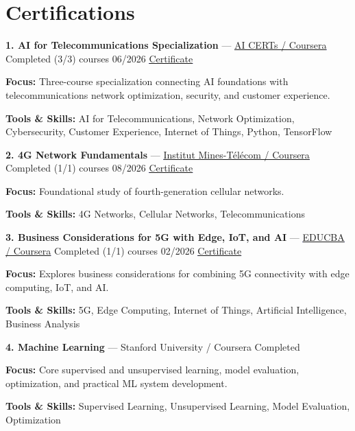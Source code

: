 \documentclass[9pt,letterpaper]{extarticle}
\begin{document}
\section{Certifications}
\noindent\textbf{1. AI for Telecommunications Specialization} {\small --- \textcolor{blue}{\underline{\href{https://coursera.org/verify/specialization/D8Y6MVC0XM51}{AI CERTs / Coursera}}} \textbar{} Completed (3/3) courses \textbar{} 06/2026 \textbar{} \textcolor{blue}{\underline{\href{https://waseemraza844.github.io/portfolio/certificates/wireless/ai-for-telecom.pdf}{Certificate}}}}\par
\textbf{Focus:} Three-course specialization connecting AI foundations with telecommunications network optimization, security, and customer experience.\par
{\small\textbf{Tools \& Skills:} AI for Telecommunications, Network Optimization, Cybersecurity, Customer Experience, Internet of Things, Python, TensorFlow\par}
\vspace{2pt}
\noindent\textbf{2. 4G Network Fundamentals} {\small --- \textcolor{blue}{\underline{\href{https://coursera.org/verify/DLW1YN474VZJ}{Institut Mines-Télécom / Coursera}}} \textbar{} Completed (1/1) courses \textbar{} 08/2026 \textbar{} \textcolor{blue}{\underline{\href{https://waseemraza844.github.io/portfolio/certificates/wireless/4g-network-fundamentals.pdf}{Certificate}}}}\par
\textbf{Focus:} Foundational study of fourth-generation cellular networks.\par
{\small\textbf{Tools \& Skills:} 4G Networks, Cellular Networks, Telecommunications\par}
\vspace{2pt}
\noindent\textbf{3. Business Considerations for 5G with Edge, IoT, and AI} {\small --- \textcolor{blue}{\underline{\href{https://coursera.org/verify/SAUEVQXV5W71}{EDUCBA / Coursera}}} \textbar{} Completed (1/1) courses \textbar{} 02/2026 \textbar{} \textcolor{blue}{\underline{\href{https://waseemraza844.github.io/portfolio/certificates/wireless/bus-cons-5g.pdf}{Certificate}}}}\par
\textbf{Focus:} Explores business considerations for combining 5G connectivity with edge computing, IoT, and AI.\par
{\small\textbf{Tools \& Skills:} 5G, Edge Computing, Internet of Things, Artificial Intelligence, Business Analysis\par}
\vspace{2pt}
\noindent\textbf{4. Machine Learning} {\small --- Stanford University / Coursera \textbar{} Completed}\par
\textbf{Focus:} Core supervised and unsupervised learning, model evaluation, optimization, and practical ML system development.\par
{\small\textbf{Tools \& Skills:} Supervised Learning, Unsupervised Learning, Model Evaluation, Optimization\par}
\vspace{2pt}
\end{document}
